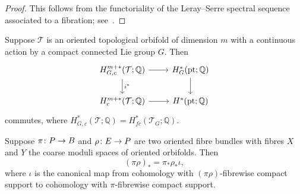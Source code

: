 \documentclass[AHL,Unicode,longabstracts]{cedram}
\newcommand{\cl}{\colon}
\newcommand{\bQ}{\mathbb{Q}}
\newcommand{\cT}{\mathcal{T}}
\DeclareMathOperator{\Pt}{pt}
\renewcommand*{\to}{\mathchoice{\longrightarrow}{\rightarrow}{\rightarrow}{\rightarrow}}
\begin{document}
\begin{proof}
This follows from the functoriality of the Leray--Serre spectral sequence associated to a fibration; see~\cite[Section~6.2]{Bre12}.
\end{proof}

\begin{coro}\label{cor:eq-trace}
Suppose $\cT$ is an oriented topological orbifold of dimension $m$ with a continuous action by a compact connected Lie group $G$. Then
\[
\begin{tikzcd}
H^{m+*}_{G,c}(\cT;\bQ)\arrow[r,] \arrow[d,"i^*"] & H^*_G(\Pt;\bQ)\arrow[d,""]\\
H^{m+*}_{c}(\cT;\bQ) \arrow[r,]& H^*(\Pt;\bQ)
\end{tikzcd}
\]
commutes, where $H^{*}_{G,c}(\cT;\bQ) = H^{*}_{fc}(\cT_G;\bQ)$.
\end{coro}

\begin{lemm}[Functoriality]\label{lem:trace-functoriality}
Suppose $\pi \cl P\to B$ and $\rho \cl E\to P$ are two oriented fibre bundles with fibres $X$ and $Y$ the coarse moduli spaces of oriented orbifolds. Then
\[
(\pi\rho)_* = \pi_*\rho_*\iota,
\]
where $\iota$ is the canonical map from cohomology with $(\pi\rho)$-fibrewise compact support to cohomology with $\pi$-fibrewise compact support.
\end{lemm}
\end{document}

